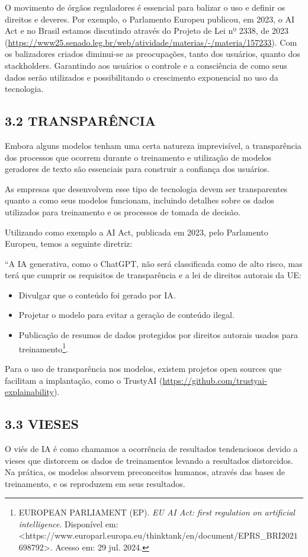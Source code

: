O movimento de órgãos reguladores é essencial para balizar o uso e definir os direitos e deveres. Por exemplo, o Parlamento Europeu publicou, em 2023, o AI Act e no Brasil estamos discutindo através do Projeto de Lei nº 2338, de 2023 (\url{https://www25.senado.leg.br/web/atividade/materias/-/materia/157233}). Com os balizadores criados diminui-se as preocupações, tanto dos usuários, quanto dos stackholders. Garantindo aos usuários o controle e a consciência de como seus dados serão utilizados e possibilitando o crescimento exponencial no uso da tecnologia. 

\subsection*{{3.2 TRANSPARÊNCIA}}
Embora alguns modelos tenham uma certa natureza imprevisível, a transparência dos processos que ocorrem durante o treinamento e utilização de modelos geradores de texto são essenciais para construir a confiança dos usuários. 

As empresas que desenvolvem esse tipo de tecnologia devem ser transparentes quanto a como seus modelos funcionam, incluindo detalhes sobre os dados utilizados para treinamento e os processos de tomada de decisão.

Utilizando como exemplo a AI Act, publicada em 2023, pelo Parlamento Europeu, temos a seguinte diretriz:

“A IA generativa, como o ChatGPT, não será classificada como de alto risco, mas terá que cumprir os requisitos de transparência e a lei de direitos autorais da UE:

\begin{itemize}
    \item Divulgar que o conteúdo foi gerado por IA.
    \item Projetar o modelo para evitar a geração de conteúdo ilegal.
    \item Publicação de resumos de dados protegidos por direitos autorais usados para treinamento\footnote{EUROPEAN PARLIAMENT (EP). \textit{EU AI Act: first regulation on artificial intelligence}. Disponível em: <https://www.europarl.europa.eu/thinktank/en/document/EPRS\_BRI\(2021\)698792>. Acesso em: 29 jul. 2024.}.
\end{itemize}

Para o uso de transparência nos modelos, existem projetos open sources que facilitam a implantação, como o TrustyAI (\url{https://github.com/trustyai-explainability}).

\subsection*{{3.3 VIESES}}
O viés de IA é como chamamos a ocorrência de resultados tendenciosos devido a vieses que distorcem os dados de treinamentos levando a resultados distorcidos. Na prática, os modelos absorvem preconceitos humanos, através das bases de treinamento, e os reproduzem em seus resultados.

